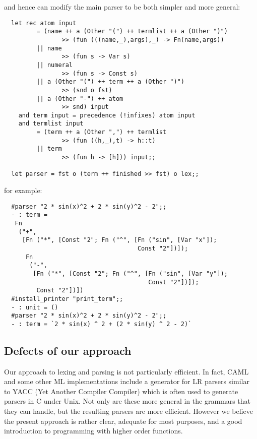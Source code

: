 \noindent and hence can modify the main parser to be both simpler and more
general:

\begin{boxed}\begin{verbatim}
  let rec atom input
         = (name ++ a (Other "(") ++ termlist ++ a (Other ")")
                >> (fun (((name,_),args),_) -> Fn(name,args))
         || name
                >> (fun s -> Var s)
         || numeral
                >> (fun s -> Const s)
         || a (Other "(") ++ term ++ a (Other ")")
                >> (snd o fst)
         || a (Other "-") ++ atom
                >> snd) input
    and term input = precedence (!infixes) atom input
    and termlist input
         = (term ++ a (Other ",") ++ termlist
                >> (fun ((h,_),t) -> h::t)
         || term
                >> (fun h -> [h])) input;;

  let parser = fst o (term ++ finished >> fst) o lex;;
\end{verbatim}\end{boxed}

\noindent for example:

\begin{boxed}\begin{verbatim}
  #parser "2 * sin(x)^2 + 2 * sin(y)^2 - 2";;
  - : term =
   Fn
    ("+",
     [Fn ("*", [Const "2"; Fn ("^", [Fn ("sin", [Var "x"]);
                                     Const "2"])]);
      Fn
       ("-",
        [Fn ("*", [Const "2"; Fn ("^", [Fn ("sin", [Var "y"]);
                                        Const "2"])]);
         Const "2"])])
  #install_printer "print_term";;
  - : unit = ()
  #parser "2 * sin(x)^2 + 2 * sin(y)^2 - 2";;
  - : term = `2 * sin(x) ^ 2 + (2 * sin(y) ^ 2 - 2)`
\end{verbatim}\end{boxed}

\subsection{Defects of our approach}

Our approach to lexing and parsing is not particularly efficient. In fact,
CAML and some other ML implementations include a generator for LR parsers
similar to YACC (Yet Another Compiler Compiler) which is often used to generate
parsers in C under Unix. Not only are these more general in the grammars that
they can handle, but the resulting parsers are more efficient. However we
believe the present approach is rather clear, adequate for most purposes, and a
good introduction to programming with higher order functions.

